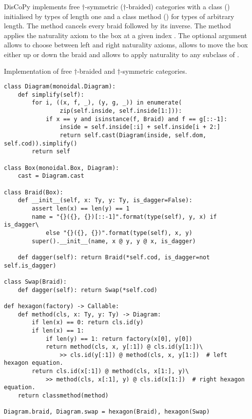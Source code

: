 DisCoPy implements free $\dagger$-symmetric ($\dagger$-braided) categories with a class  () initialised by types of length one and a class method  () for types of arbitrary length.
The method  cancels every braid followed by its inverse.
The  method applies the naturality axiom to the box at a given index .
The optional argument  allows to choose between left and right naturality axioms,  allows to move the box either up or down the braid and  allows to apply naturality to any subclass of .

\begin{python}
{\normalfont Implementation of free $\dagger$-braided and $\dagger$-symmetric categories.}

\begin{verbatim}
class Diagram(monoidal.Diagram):
    def simplify(self):
        for i, ((x, f, _), (y, g, _)) in enumerate(
                zip(self.inside, self.inside[1:])):
            if x == y and isinstance(f, Braid) and f == g[::-1]:
                inside = self.inside[:i] + self.inside[i + 2:]
                return self.cast(Diagram(inside, self.dom, self.cod)).simplify()
        return self

class Box(monoidal.Box, Diagram):
    cast = Diagram.cast

class Braid(Box):
    def __init__(self, x: Ty, y: Ty, is_dagger=False):
        assert len(x) == len(y) == 1
        name = "{}({}, {})[::-1]".format(type(self), y, x) if is_dagger\
            else "{}({}, {})".format(type(self), x, y)
        super().__init__(name, x @ y, y @ x, is_dagger)

    def dagger(self): return Braid(*self.cod, is_dagger=not self.is_dagger)

class Swap(Braid):
    def dagger(self): return Swap(*self.cod)

def hexagon(factory) -> Callable:
    def method(cls, x: Ty, y: Ty) -> Diagram:
        if len(x) == 0: return cls.id(y)
        if len(x) == 1:
            if len(y) == 1: return factory(x[0], y[0])
            return method(cls, x, y[:1]) @ cls.id(y[1:])\
                >> cls.id(y[:1]) @ method(cls, x, y[1:])  # left hexagon equation.
        return cls.id(x[:1]) @ method(cls, x[1:], y)\
            >> method(cls, x[:1], y) @ cls.id(x[1:])  # right hexagon equation.
    return classmethod(method)

Diagram.braid, Diagram.swap = hexagon(Braid), hexagon(Swap)


\end{verbatim}
\end{python}
